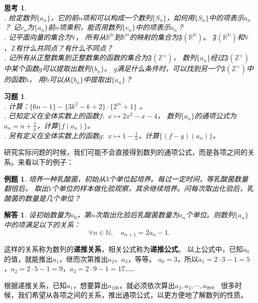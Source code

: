 \documentclass[12pt,UTF8]{ctexbook}
\newtheorem{et}{例题}[section]
\newtheorem{sk}{思考}[section]
\newtheorem*{so}{解答}
\newtheorem{xt}{习题}[section]
\begin{document}
\begin{sk}
    \mbox{}\\
. 给定数列$\{a_n\}$，它的前$n$项和可以构成一个数列$\{S_n\}$，如何用$\{S_n\}$中的项表示$a_n$？
记$v_n$为$\{a_n\}$前$n$项乘积，能否用数列$\{v_n\}$中的项表示$a_n$？\\
. 记平面向量的集合为$\mathbb{V}$，
所有从$\mathbb{R}^\mathbb{N}$到$\mathbb{R}^\mathbb{N}$的映射的集合为$\mathfrak{F}(\mathbb{R}^\mathbb{N})$。
$\mathfrak{F}(\mathbb{R}^\mathbb{N})$和$\mathbb{V}$、$\mathbb{Z}$有什么共同点？有什么不同点？\\
. 记所有从正整数集到正整数集的函数的集合为$\mathfrak{F}(\mathbb{Z}^+)$，
数列$\{a_n\}$经过$\mathfrak{F}(\mathbb{Z}^+)$中某个函数$g$可以提取出数列$\{b_n\}$。
$g$满足什么条件时，可以找到另一个$\mathfrak{F}(\mathbb{Z}^+)$中的函数$h$，
用$h$可以从$\{b_n\}$中提取出$\{a_n\}$？
\end{sk}

\begin{xt}
    \mbox{}\\
    . 计算：$\{6n-1\} - \{3k^2 - k + 2\} \cdot \{2^m+1\}$ 。\\
    . 已知定义在全体实数上的函数$f:\,\, x\mapsto 2x^2 - x - 4$，
    数列$\{a_n\}$的通项公式为$a_n = n + \frac{1}{n}$，计算$\{f(a_n)\}$。\\
    . 另有定义在全体实数上的函数$g:\,\, x\mapsto 1 - \frac{1}{x}$，计算$\{(f - g)(a_n)\}$。
\end{xt}

研究实际问题的时候，我们可能不会直接得到数列的通项公式，而是各项之间的关系。来看以下的例子：
\begin{et}
培养一种乳酸菌，初始从$3$个单位起培养。每过一定时间，等乳酸菌数量翻倍后，
取出$1$个单位的样本做化验观察，其余继续培养。问每次取出化验后，乳酸菌的数量是几个单位？
\end{et}
\begin{so}
设初始数量为$a_0$，第$n$次取出化验后乳酸菌数量为$a_n$个单位。则数列$\{a_n\}$中的项满足以下的关系：
$$ \forall n \in \mathbb{N}, \quad a_{n+1} = 2a_n - 1. $$
\end{so}
这样的关系称为数列的\textbf{递推关系}，相关公式称为\textbf{递推公式}。
以上公式中，已知$a_0$的值，就能推出$a_1$，继而次第推出$a_2$、$a_3$，等等。
$a_0 = 3$，所以$a_1 = 2\cdot 3 - 1= 5$，$a_2 = 2\cdot 5 - 1= 9$，$a_3 = 2\cdot 9 - 1= 17$……

根据递推关系，已知$a_1$，想要算出$a_{100}$，就必须依次算出$a_2,a_3,\cdots,a_{99}$。
很多时候，我们希望从各项之间的关系，推出通项公式，以更方便地了解数列的性质。
\end{document}
